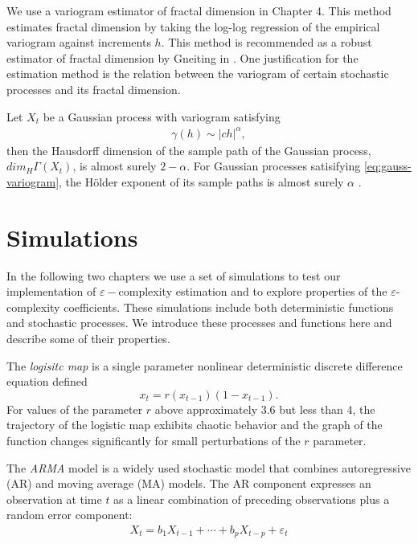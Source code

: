 We use a variogram estimator of fractal dimension in Chapter 4. 
This method estimates fractal dimension by taking the log-log regression of the empirical variogram against increments $h$. This method is recommended as a robust estimator of fractal dimension
 by Gneiting in \cite{gneiting2012}.
One justification for the estimation method is the relation between the variogram of certain stochastic processes and its fractal dimension.
\begin{prop}\label{prop:gauss-variogram}
  Let $X_t$ be a Gaussian process with variogram satisfying
  \begin{align}\label{eq:gauss-variogram}
    \gamma(h) \sim|ch|^{\alpha},
  \end{align}  
  then the Hausdorff dimension of the sample path of 
  the Gaussian process, $dim_H \Gamma(X_t)$, is almost surely $2 - \alpha$. For Gaussian processes satisifying 
\ref{eq:gauss-variogram}, the H\"older exponent of its sample paths
is almost surely $\alpha$\cite{gneiting2012} \cite{orey1970}. 
\end{prop} 

\section{Simulations}

In the following two chapters we use a set of simulations to test our implementation of $\varepsilon-$complexity
estimation and to explore
properties of the $\varepsilon$-complexity coefficients. 
These simulations include both deterministic functions
and stochastic processes. We introduce these
processes and functions here and describe some of their properties.

The \textit{logisitc map} is a single parameter nonlinear deterministic discrete difference equation defined
\[
  x_t = r(x_{t-1})(1 - x_{t-1}).
\]
For values of the parameter $r$ above approximately 3.6 but less than 4, the trajectory of the 
logistic map exhibits chaotic behavior and the graph of the function
changes significantly for small perturbations of the $r$ parameter. 


The \textit{ARMA} model is a widely used stochastic model
that combines autoregressive (AR) and moving average (MA)
models. The AR component expresses an observation at time 
$t$ as a linear combination
of preceding observations plus a random error component:
\begin{align*}
  X_t  = b_1 X_{t-1} + \cdots + b_p X_{t-p} + \varepsilon_t
\end{align*}

